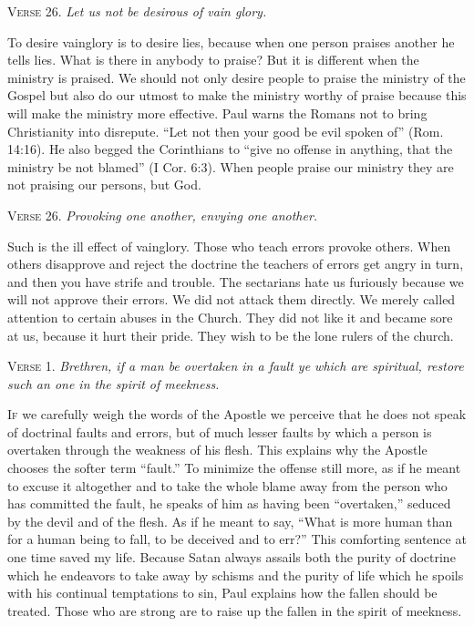 \textsc{Verse} 26. \emph{Let us not be desirous of vain glory.}

To desire vainglory is to desire lies, because when one person praises another he tells lies. What is there in anybody to praise? But it is different when the ministry is praised. We should not only desire people to praise the ministry of the Gospel but also do our utmost to make the ministry worthy of praise because this will make the ministry more effective. Paul warns the Romans not to bring Christianity into disrepute. “Let not then your good be evil spoken of” (Rom. 14:16). He also begged the Corinthians to “give no offense in anything, that the ministry be not blamed” (I Cor. 6:3). When people praise our ministry they are not praising our persons, but God.

\textsc{Verse} 26. \emph{Provoking one another, envying one another.}

Such is the ill effect of vainglory. Those who teach errors provoke others. When others disapprove and reject the doctrine the teachers of errors get angry in turn, and then you have strife and trouble. The sectarians hate us furiously because we will not approve their errors. We did not attack them directly. We merely called attention to certain abuses in the Church. They did not like it and became sore at us, because it hurt their pride. They wish to be the lone rulers of the church.


\textsc{Verse} 1. \emph{Brethren, if a man be overtaken in a fault ye which are spiritual, restore such an one in the spirit of meekness.}

\textsc{If} we carefully weigh the words of the Apostle we perceive that he does not speak of doctrinal faults and errors, but of much lesser faults by which a person is overtaken through the weakness of his flesh. This explains why the Apostle chooses the softer term “fault.” To minimize the offense still more, as if he meant to excuse it altogether and to take the whole blame away from the person who has committed the fault, he speaks of him as having been “overtaken,” seduced by the devil and of the flesh. As if he meant to say, “What is more human than for a human being to fall, to be deceived and to err?” This comforting sentence at one time saved my life. Because Satan always assails both the purity of doctrine which he endeavors to take away by schisms and the purity of life which he spoils with his continual temptations to sin, Paul explains how the fallen should be treated. Those who are strong are to raise up the fallen in the spirit of meekness.

